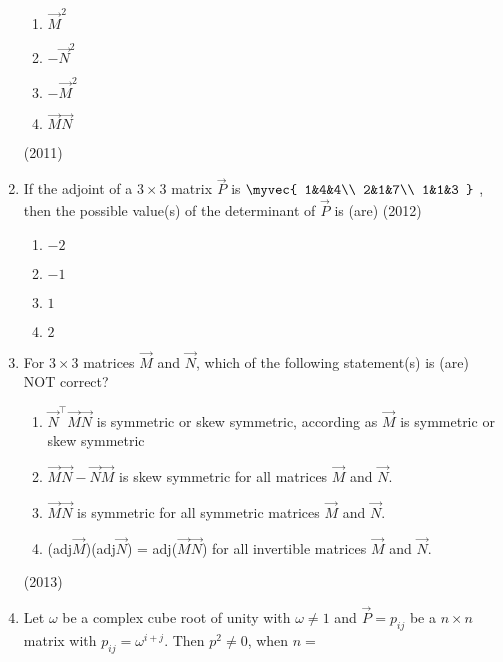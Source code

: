 \begin{enumerate}[label=\thesubsection.\arabic*.,ref=\thesubsection.\theenumi]
\begin{multicols}{4}
        \begin{enumerate}
            \item $\vec{M}^2$
            \item $-\vec{N}^2$
            \item $-\vec{M}^2$
            \item $\vec{M}\vec{N}$
        \end{enumerate}
\end{multicols}
        \hfill (2011)
    \item 
        If the adjoint of a $3 \times 3$ matrix $\vec{P}$ is 
                $\myvec{	
                    1&4&4\\
                    2&1&7\\
                    1&1&3
                }$
        , then the possible value(s) of the determinant of $\vec{P}$ is (are)
            \hfill (2012)
\begin{multicols}{4}
            \begin{enumerate}
                \item $-2$
                \item $-1$
                \item $1$
                \item $2$
            \end{enumerate}
\end{multicols}
    \item 
        For $3 \times 3$ matrices $\vec{M}$ and $\vec{N}$, which of the following statement(s) is (are) NOT correct?
            \begin{enumerate}
                \item $\vec{N}^{\top}\vec{M}\vec{N}$ is symmetric or skew symmetric, according as $\vec{M}$ is symmetric or skew symmetric
                \item $\vec{M}\vec{N}-\vec{N}\vec{M}$ is skew symmetric for all matrices $\vec{M}$ and $\vec{N}$.
                \item $\vec{M}\vec{N}$ is symmetric for all symmetric matrices $\vec{M}$ and $\vec{N}$.
                \item (adj$\vec{M}$)(adj$\vec{N}$) = adj($\vec{M}\vec{N}$) for all invertible matrices $\vec{M}$ and $\vec{N}$.
            \end{enumerate}
            \hfill (2013)
    \item 
        Let $\omega$ be a complex cube root of unity with $\omega \neq 1 $ and $\vec{P}={p_{ij}}$ be a $n \times n$ matrix with $p_{ij} = \omega^{i+j}$. Then $p^2 \neq 0$, when $n=$

\end{enumerate}
